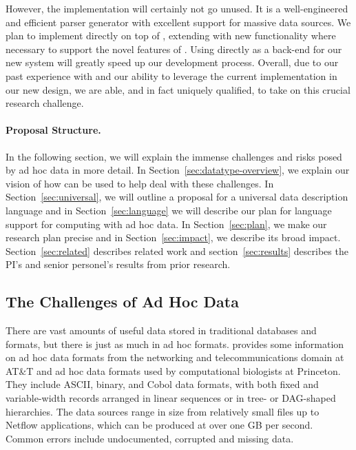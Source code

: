 \documentclass[11pt]{article}
\begin{document}
However, the \pads{} implementation will certainly not go unused.  It is a well-engineered
and efficient parser generator with excellent support for massive data sources.
We plan to implement \datatype{} directly on top of \pads{}, extending \pads{}
with new functionality where necessary to support the novel features 
of \datatype.  Using \pads{} directly as a back-end for our
new system will greatly speed up our development process.
Overall, due to our past experience with \pads{} and
our ability to leverage the current implementation in our new design,
we are able, and in fact uniquely qualified, to take on this crucial
research challenge.

\paragraph*{Proposal Structure.}
In the following section, we will explain the immense
challenges and risks posed by ad hoc data in more detail.  
In Section~\ref{sec:datatype-overview}, we
explain our vision of how \datatype{} can be used to help deal with these
challenges.  In Section~\ref{sec:universal}, we will outline a proposal
for a universal data description language and in Section~\ref{sec:language}
we will describe our plan for language support for computing with
ad hoc data.  In Section~\ref{sec:plan}, we make our research plan precise
and in Section~\ref{sec:impact}, we describe its broad impact.
Section~\ref{sec:related} describes related work and
section~\ref{sec:results} describes the PI's and senior personel's
results from prior research.

\subsection{The Challenges of Ad Hoc Data}
\label{sec:challenges}

There are vast amounts of useful data stored in traditional databases
and \xml{} formats, but there is just as much in ad hoc formats.
 provides some information on ad hoc data
formats from the networking and telecommunications domain at AT\&T and
ad hoc data formats used by computational biologists at Princeton.
They include ASCII, binary, and Cobol data formats, with both fixed
and variable-width records arranged in linear sequences or in tree- or
DAG-shaped hierarchies.  The data sources range in size from
relatively small files up to Netflow
applications, which can be produced at over one GB per second.  Common
errors include undocumented, corrupted and missing data.
\end{document}
